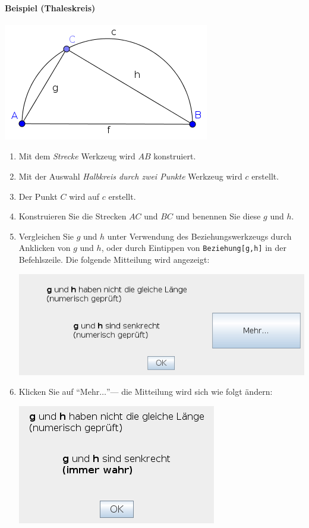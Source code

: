 \documentclass{article}
\begin{document}
\paragraph{Beispiel (Thaleskreis)}
\begin{center}
\includegraphics[scale=0.5]{Relation-example}
\end{center}
\begin{enumerate}
    \item Mit dem \textit{Strecke} Werkzeug wird $AB$ konstruiert.
    \item Mit der Auswahl \textit{Halbkreis durch zwei Punkte} Werkzeug wird $c$ erstellt.
    \item Der Punkt $C$ wird auf $c$ erstellt.
    \item Konstruieren Sie die Strecken $AC$ und $BC$ und benennen Sie diese $g$ und $h$.
    \item Vergleichen Sie $g$ und $h$ unter Verwendung des Beziehungswerkzeugs durch Anklicken von $g$ und $h$, oder durch Eintippen von \texttt{Beziehung[g,h]} in der Befehlszeile. Die folgende Mitteilung wird angezeigt:
    \begin{center}
    \includegraphics[scale=0.5]{Relation-example-Relation1-de}
    \end{center}
    \item Klicken Sie auf ``Mehr$\ldots$''--- die Mitteilung wird sich wie folgt ändern:
    \begin{center}
    \includegraphics[scale=0.5]{Relation-example-Relation2-de}
    \end{center}
    
\end{enumerate}
\end{document}
